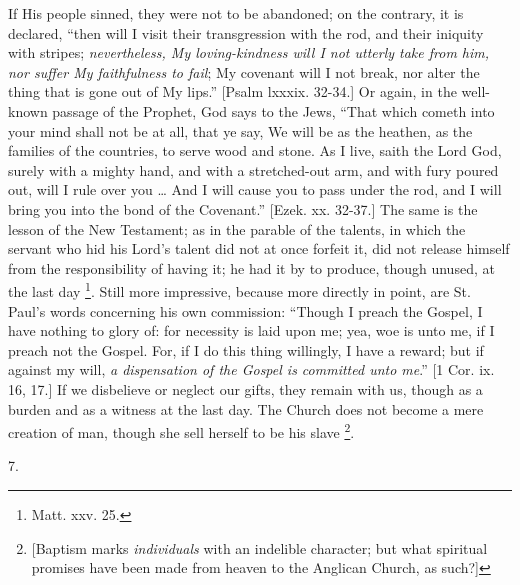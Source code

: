 If His people sinned, they were not to be abandoned; on the contrary,
it is declared, ``then will I visit their transgression with the
rod, and their iniquity with stripes; \emph{nevertheless, My
loving-kindness will I not utterly take from him, nor suffer My
faithfulness to fail}; My covenant will I not break, nor alter the
thing that is gone out of My lips.'' [Psalm lxxxix. 32-34.] Or
again, in the well-known passage of the Prophet, God says to the Jews,
``That which cometh into your mind shall not be at all, that ye
say, We will be as the heathen, as the families of the countries, to
serve wood and stone. As I live, saith the Lord God, surely with a
mighty hand, and with a stretched-out arm, and with fury poured out,
will I rule over you … And I will cause you to pass under the rod,
and I will bring you into the bond of the Covenant.'' [Ezek. xx.
32-37.] The same is the lesson of the New Testament; as in the parable
of the talents, in which the servant who hid his Lord's talent did not
at once forfeit it, did not release himself from the responsibility of
having it; he had it by to produce, though unused, at the last day \footnote{Matt. xxv. 25.}. Still more impressive, because more directly in point, are St.
Paul's words concerning his own commission: ``Though I
preach the Gospel, I have nothing to glory of: for necessity is laid
upon me; yea, woe is unto me, if I preach not the Gospel. For, if I do
this thing willingly, I have a reward; but if against my will, \emph{a
dispensation of the Gospel is committed unto me}.'' [1 Cor. ix.
16, 17.] If we disbelieve or neglect our gifts, they remain with us,
though as a burden and as a witness at the last day. The Church does
not become a mere creation of man, though she sell herself to be his
slave \footnote{[Baptism marks \emph{individuals} with an
indelible character; but what spiritual promises have been made from
heaven to the Anglican Church, as such?]}.

7.

